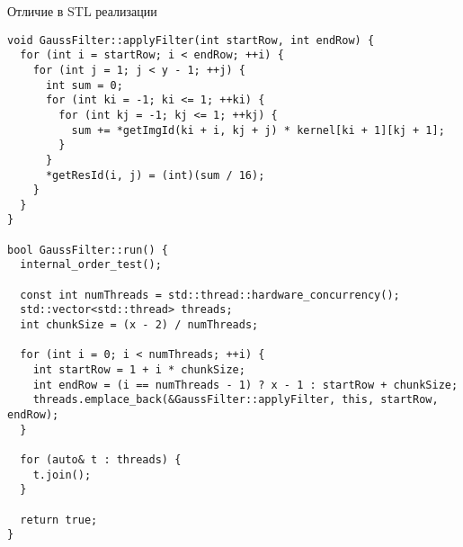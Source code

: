 \documentclass{report}
\begin{document}
\par Отличие в STL реализации
\begin{lstlisting}
void GaussFilter::applyFilter(int startRow, int endRow) {
  for (int i = startRow; i < endRow; ++i) {
    for (int j = 1; j < y - 1; ++j) {
      int sum = 0;
      for (int ki = -1; ki <= 1; ++ki) {
        for (int kj = -1; kj <= 1; ++kj) {
          sum += *getImgId(ki + i, kj + j) * kernel[ki + 1][kj + 1];
        }
      }
      *getResId(i, j) = (int)(sum / 16);
    }
  }
}

bool GaussFilter::run() {
  internal_order_test();

  const int numThreads = std::thread::hardware_concurrency();
  std::vector<std::thread> threads;
  int chunkSize = (x - 2) / numThreads;

  for (int i = 0; i < numThreads; ++i) {
    int startRow = 1 + i * chunkSize;
    int endRow = (i == numThreads - 1) ? x - 1 : startRow + chunkSize;
    threads.emplace_back(&GaussFilter::applyFilter, this, startRow, endRow);
  }

  for (auto& t : threads) {
    t.join();
  }

  return true;
}
\end{lstlisting}
\end{document}
